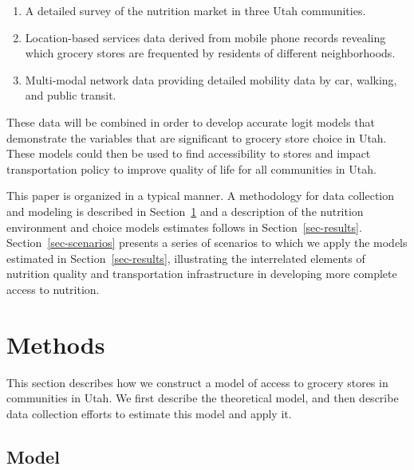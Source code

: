 \documentclass[
  letterpaper,
  number,
  review,
  3p]{elsarticle}
\providecommand{\tightlist}{%
  \setlength{\itemsep}{0pt}\setlength{\parskip}{0pt}}\usepackage{longtable,booktabs,array}
\begin{document}
\begin{enumerate}
\def\labelenumi{\arabic{enumi}.}
\tightlist
\item
  A detailed survey of the nutrition market in three Utah communities.
\item
  Location-based services data derived from mobile phone records
  revealing which grocery stores are frequented by residents of
  different neighborhoods.
\item
  Multi-modal network data providing detailed mobility data by car,
  walking, and public transit.
\end{enumerate}

These data will be combined in order to develop accurate logit models
that demonstrate the variables that are significant to grocery store
choice in Utah. These models could then be used to find accessibility to
stores and impact transportation policy to improve quality of life for
all communities in Utah.

This paper is organized in a typical manner. A methodology for data
collection and modeling is described in Section~\ref{sec-methods} and a
description of the nutrition environment and choice models estimates
follows in Section~\ref{sec-results}. Section~\ref{sec-scenarios}
presents a series of scenarios to which we apply the models estimated in
Section~\ref{sec-results}, illustrating the interrelated elements of
nutrition quality and transportation infrastructure in developing more
complete access to nutrition.


\section{Methods}\label{sec-methods}

This section describes how we construct a model of access to grocery
stores in communities in Utah. We first describe the theoretical model,
and then describe data collection efforts to estimate this model and
apply it.

\subsection{Model}\label{model}
\end{document}
